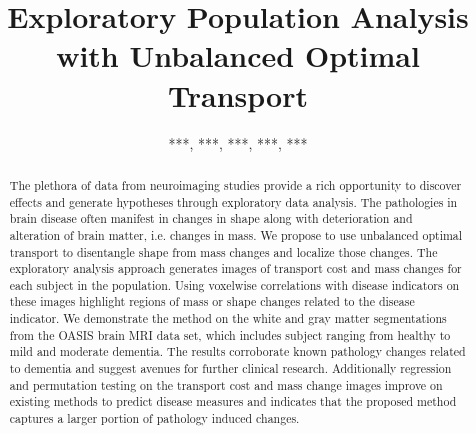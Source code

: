 \documentclass{llncs}
\begin{document}
\title{Exploratory Population Analysis with Unbalanced Optimal Transport}

\author{***, ***, ***, ***, ***}%
\authorrunning{***}%
\institute{***\\%
\email{***@***.**}%
\and
***%
}

\maketitle              




\begin{abstract}
The plethora of data from neuroimaging studies provide a rich opportunity to
discover effects and generate hypotheses through exploratory data analysis. The
pathologies in brain disease often manifest in changes in shape along with
deterioration and alteration of brain matter, i.e. changes in mass. We propose
to use unbalanced optimal transport to disentangle shape from mass changes and
localize those changes. The exploratory analysis approach generates images of
transport cost and mass changes for each subject in the population.  Using
voxelwise correlations with disease indicators on these images highlight
regions of mass or shape changes related to the disease indicator.  We
demonstrate the method on the white and gray matter segmentations from the
OASIS brain MRI data set, which includes subject ranging from healthy to mild
and moderate dementia. The results corroborate known pathology changes related
to dementia and suggest avenues for further clinical research. Additionally
regression and permutation testing on the transport cost and mass change images
improve on existing methods to predict disease measures and indicates that the
proposed method captures a larger portion of pathology induced changes.
\end{abstract}
\end{document}
